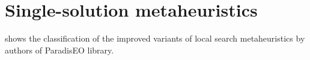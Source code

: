 \documentclass[
  print, %
  Table,   %
  nolof,     %
  nolot,     %
  11pt, %
  oneside  %
]{fithesis3}
\begin{document}



\section{Single-solution metaheuristics}
\label{sec:opt-single-sol}

 shows the classification of the improved variants of local search metaheuristics by authors of ParadisEO library.
\end{document}
